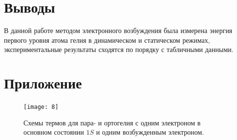 \documentclass[a4paper]{article}
\begin{document}
\section{Выводы}
В данной работе методом электронного возбуждения была
измерена энергия первого уровня атома гелия в динамическом
и статическом режимах, экспериментальные результаты сходятся по
порядку с табличными данными.
\printbibliography
\newpage
\appendix
\section{Приложение}
\begin{figure}[ht]
	\centering
	\texttt{[image: 8]}
	\caption{Схемы термов для пара- и ортогелия с одним электроном в основном состоянии $1S$ и одним возбужденным электроном.\cite{wiki:xxx}}
	\label{fig:8}
\end{figure}
\end{document}
